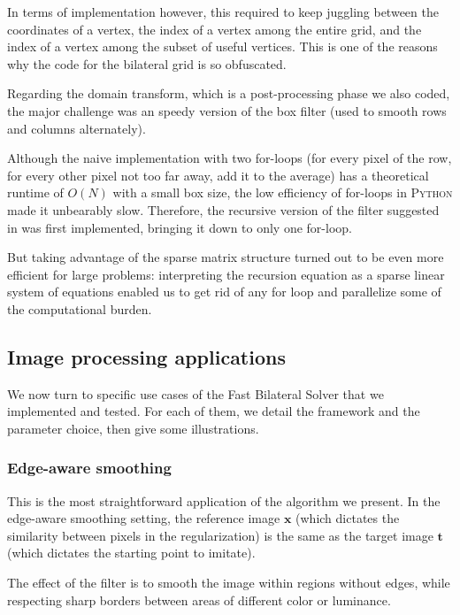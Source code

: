 \documentclass{article}
\begin{document}
In terms of implementation however, this required to keep juggling between the coordinates of a vertex, the index of a vertex among the entire grid, and the index of a vertex among the subset of useful vertices. This is one of the reasons why the code for the bilateral grid is so obfuscated.

\medskip

Regarding the domain transform, which is a post-processing phase we also coded, the major challenge was an speedy version of the box filter (used to smooth rows and columns alternately).

Although the naive implementation with two for-loops (for every pixel of the row, for every other pixel not too far away, add it to the average) has a theoretical runtime of $O(N)$ with a small box size, the low efficiency of for-loops in \textsc{Python} made it unbearably slow. Therefore, the recursive version of the filter suggested in \cite{gastal_domain_2011} was first implemented, bringing it down to only one for-loop.

But taking advantage of the sparse matrix structure turned out to be even more efficient for large problems: interpreting the recursion equation as a sparse linear system of equations enabled us to get rid of any for loop and parallelize some of the computational burden.

\subsection{Image processing applications}

We now turn to specific use cases of the Fast Bilateral Solver that we implemented and tested. For each of them, we detail the framework and the parameter choice, then give some illustrations.

\subsubsection{Edge-aware smoothing}

This is the most straightforward application of the algorithm we present. In the edge-aware smoothing setting, the reference image $\textbf{x}$ (which dictates the similarity between pixels in the regularization) is the same as the target image $\textbf{t}$ (which dictates the starting point to imitate).

The effect of the filter is to smooth the image within regions without edges, while respecting sharp borders between areas of different color or luminance.
\end{document}
